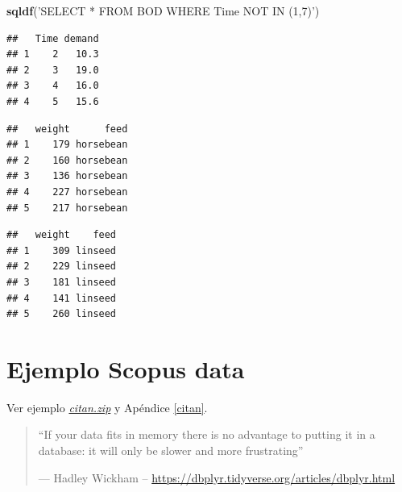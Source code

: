 \documentclass[
]{book}
\newenvironment{Shaded}{\begin{snugshade}}{\end{snugshade}}
\newcommand{\KeywordTok}[1]{\textcolor[rgb]{0.13,0.29,0.53}{\textbf{#1}}}
\newcommand{\NormalTok}[1]{#1}
\newcommand{\StringTok}[1]{\textcolor[rgb]{0.31,0.60,0.02}{#1}}
\begin{document}
\begin{Shaded}
\begin{Highlighting}[]
\KeywordTok{sqldf}\NormalTok{(}\StringTok{'SELECT * FROM BOD WHERE Time NOT IN (1,7)'}\NormalTok{)}
\end{Highlighting}
\end{Shaded}

\begin{verbatim}
##   Time demand
## 1    2   10.3
## 2    3   19.0
## 3    4   16.0
## 4    5   15.6
\end{verbatim}

\begin{Shaded}
\end{Shaded}

\begin{verbatim}
##   weight      feed
## 1    179 horsebean
## 2    160 horsebean
## 3    136 horsebean
## 4    227 horsebean
## 5    217 horsebean
\end{verbatim}

\begin{Shaded}
\end{Shaded}

\begin{verbatim}
##   weight    feed
## 1    309 linseed
## 2    229 linseed
## 3    181 linseed
## 4    141 linseed
## 5    260 linseed
\end{verbatim}

\hypertarget{ejemplo-scopus-data}{%
\section{Ejemplo Scopus data}\label{ejemplo-scopus-data}}

Ver ejemplo \href{data/citan.zip}{\emph{citan.zip}} y Apéndice \ref{citan}.

\begin{quote}
``If your data fits in memory
there is no advantage to putting it in a database:
it will only be slower and more frustrating''

--- Hadley Wickham -- \url{https://dbplyr.tidyverse.org/articles/dbplyr.html}
\end{quote}
\end{document}
